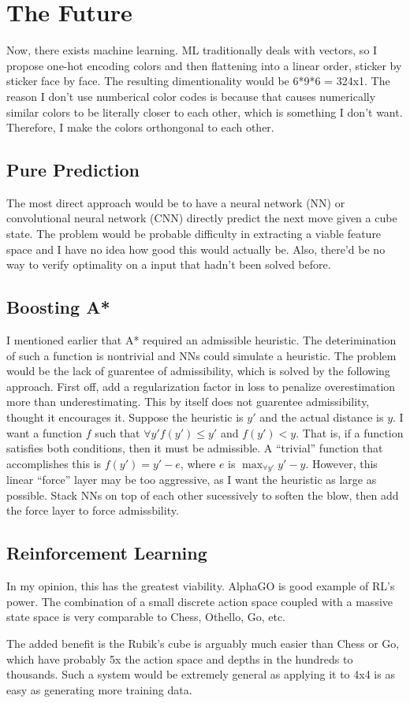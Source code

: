 \documentclass[11pt, oneside]{article}
\begin{document}
\section{The Future}
Now, there exists machine learning.
ML traditionally deals with vectors, so I propose one-hot encoding colors and then flattening into a linear order,
sticker by sticker face by face. The resulting dimentionality would be 6*9*6 = 324x1. The reason I don't use numberical color codes
is because that causes numerically similar colors to be literally closer to each other, which is something I don't want. Therefore,
I make the colors orthongonal to each other.

\subsection{Pure Prediction}

The most direct approach would be to have a neural network (NN) or convolutional neural network (CNN) directly predict the next move
given a cube state. The problem would be probable difficulty in extracting a viable feature space and I have no idea how good this would actually be.
Also, there'd be no way to verify optimality on a input that hadn't been solved before.

\subsection{Boosting A*}

I mentioned earlier that A* required an admissible heuristic. The deterimination of such a function is nontrivial and NNs could simulate a heuristic.
The problem would be the lack of guarentee of admissibility, which is solved by the following approach.
First off, add a regularization factor in loss to penalize overestimation more than underestimating.
This by itself does not guarentee admissibility, thought it encourages it. Suppose the heuristic is \( y' \) and the actual distance is \( y \).
I want a function \( f \) such that \( \forall y' f(y') \leq y' \) and \( f(y') < y \). That is, if a function satisfies both conditions, then it must be admissible.
A ``trivial'' function that accomplishes this is  \( f(y') = y' - e \), where \( e \) is \( \max_{\forall y'} y' - y \).
However, this linear ``force'' layer may be too aggressive, as I want the heuristic as large as possible.
Stack NNs on top of each other sucessively to soften the blow, then add the force layer to force admissbility.

\subsection{Reinforcement Learning}

In my opinion, this has the greatest viability. AlphaGO is good example of RL's power.
The combination of a small discrete action space coupled with a massive state space is very comparable to Chess, Othello, Go, etc.

The added benefit is the Rubik's cube is arguably much easier than Chess or Go, which have probably 5x the action space and depths in the hundreds to thousands.
Such a system would be extremely general as applying it to 4x4 is as easy as generating more training data.
\end{document}
